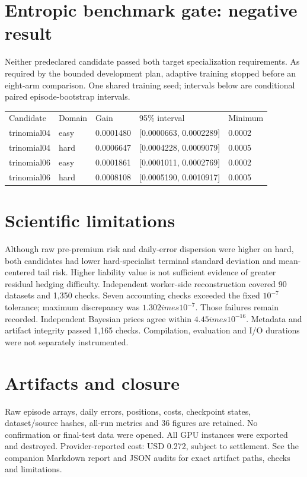 \documentclass{article}
\begin{document}
\section*{Entropic benchmark gate: negative result}
Neither predeclared candidate passed both target specialization requirements. As required by the bounded development plan, adaptive training stopped before an eight-arm comparison. One shared training seed; intervals below are conditional paired episode-bootstrap intervals.
\begin{center}
\begin{tabular}{lllll}
Candidate & Domain & Gain & 95\% interval & Minimum \\
trinomial04 & easy & 0.0001480 & [0.0000663, 0.0002289] & 0.0002 \\
trinomial04 & hard & 0.0006647 & [0.0004228, 0.0009079] & 0.0005 \\
trinomial06 & easy & 0.0001861 & [0.0001011, 0.0002769] & 0.0002 \\
trinomial06 & hard & 0.0008108 & [0.0005190, 0.0010917] & 0.0005 \\
\end{tabular}
\end{center}
\section*{Scientific limitations}
Although raw pre-premium risk and daily-error dispersion were higher on hard, both candidates had lower hard-specialist terminal standard deviation and mean-centered tail risk. Higher liability value is not sufficient evidence of greater residual hedging difficulty.
Independent worker-side reconstruction covered 90 datasets and 1,350 checks. Seven accounting checks exceeded the fixed $10^{-7}$ tolerance; maximum discrepancy was $1.302	imes10^{-7}$. Those failures remain recorded. Independent Bayesian prices agree within $4.45	imes10^{-16}$. Metadata and artifact integrity passed 1,165 checks. Compilation, evaluation and I/O durations were not separately instrumented.
\section*{Artifacts and closure}
Raw episode arrays, daily errors, positions, costs, checkpoint states, dataset/source hashes, all-run metrics and 36 figures are retained. No confirmation or final-test data were opened. All GPU instances were exported and destroyed. Provider-reported cost: USD 0.272, subject to settlement. See the companion Markdown report and JSON audits for exact artifact paths, checks and limitations.
\end{document}
